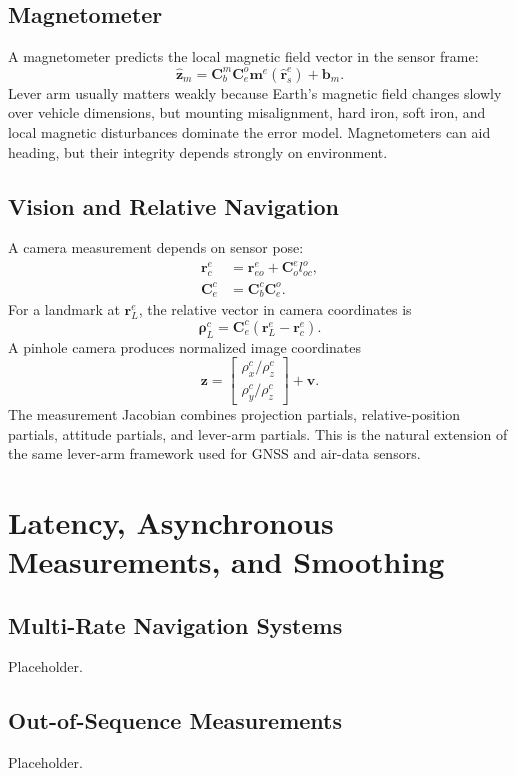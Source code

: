 \documentclass[11pt,oneside]{book}
\newcommand{\rb}{\mathbf{r}}
\newcommand{\bb}{\mathbf{b}}
\newcommand{\Ceo}{\mathbf{C}^{o}_{e}}
\newcommand{\Coe}{\mathbf{C}^{e}_{o}}
\begin{document}
\section{Magnetometer}
A magnetometer predicts the local magnetic field vector in the sensor frame:
\begin{equation}
\hat{\mathbf{z}}_m=\mathbf{C}_b^m\mathbf{C}_e^o\mathbf{m}^e(\hat{\rb}_s^e)+\bb_m.
\end{equation}
Lever arm usually matters weakly because Earth's magnetic field changes slowly over vehicle dimensions, but mounting misalignment, hard iron, soft iron, and local magnetic disturbances dominate the error model. Magnetometers can aid heading, but their integrity depends strongly on environment.

\section{Vision and Relative Navigation}
A camera measurement depends on sensor pose:
\begin{align}
\rb_c^e &= \rb_{eo}^e+\Coe l_{oc}^o,\\
\mathbf{C}_e^c &= \mathbf{C}_b^c\Ceo.
\end{align}
For a landmark at $\rb_L^e$, the relative vector in camera coordinates is
\begin{equation}
\boldsymbol\rho_L^c=\mathbf{C}_e^c(\rb_L^e-\rb_c^e).
\end{equation}
A pinhole camera produces normalized image coordinates
\begin{equation}
\mathbf{z}=\begin{bmatrix}\rho_x^c/\rho_z^c\\\rho_y^c/\rho_z^c\end{bmatrix}+\mathbf{v}.
\end{equation}
The measurement Jacobian combines projection partials, relative-position partials, attitude partials, and lever-arm partials. This is the natural extension of the same lever-arm framework used for GNSS and air-data sensors.

\chapter{Latency, Asynchronous Measurements, and Smoothing}
\section{Multi-Rate Navigation Systems}
Placeholder.
\section{Out-of-Sequence Measurements}
Placeholder.
\end{document}
